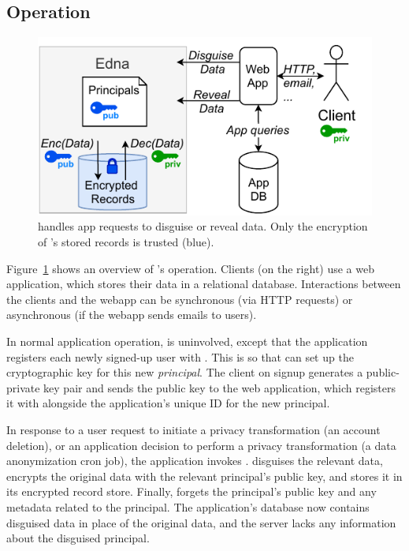 \subsection{\sys Operation}

\begin{figure}[t]
  \centering
    \includegraphics{figs/edna_arch}
  \caption{\sys handles app requests to disguise or reveal data. Only the
    encryption of \sys's stored records is trusted (blue).}
  \label{f:edna-overview}
\end{figure}

%
Figure~\ref{f:edna-overview} shows an overview of \sys's operation.
%
Clients (on the right) use a web application, which stores their data in a
relational database.
%
Interactions between the clients and the webapp can be synchronous (via HTTP
requests) or asynchronous (\eg if the webapp sends emails to users).
%

%
In normal application operation, \sys is uninvolved, except that the application
registers each newly signed-up user with \sys.
%
This is so that \sys can set up the cryptographic key for this new \emph{principal}.
%
The client on signup generates a public-private key pair and sends the public
key to the web application, which registers it with \sys alongside the
application's unique ID for the new principal.
%

%
In response to a user request to initiate a privacy transformation (\eg an account
deletion), or an application decision to perform a privacy transformation (\eg a
data anonymization cron job), the application invokes \sys.
%
\sys disguises the relevant data, encrypts the original data with the relevant
principal's public key, and stores it in its encrypted record store.
%
Finally, \sys forgets the principal's public key and any metadata related to the
principal.
%
The application's database now contains disguised data in place of the original
data, and the server lacks any information about the disguised principal.
%


